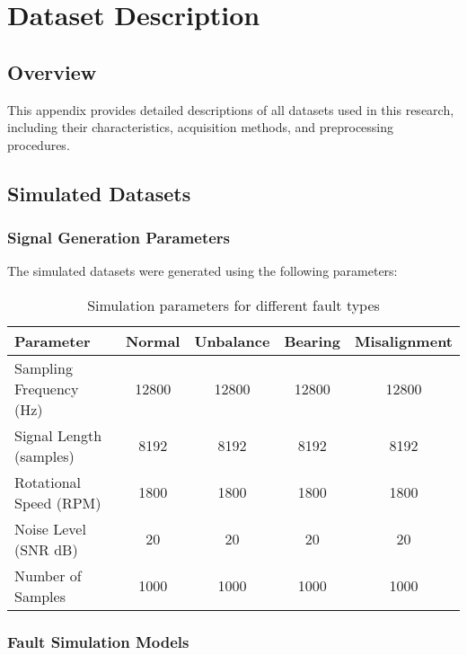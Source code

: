 
\chapter{Dataset Description}

\section{Overview}

This appendix provides detailed descriptions of all datasets used in this research, including their characteristics, acquisition methods, and preprocessing procedures.

\section{Simulated Datasets}

\subsection{Signal Generation Parameters}

The simulated datasets were generated using the following parameters:

\begin{table}[H]
\centering
\caption{Simulation parameters for different fault types}
\label{tab:simulation_params}
\begin{tabular}{@{}lcccc@{}}
\toprule
Parameter & Normal & Unbalance & Bearing & Misalignment \\
\midrule
Sampling Frequency (Hz) & 12800 & 12800 & 12800 & 12800 \\
Signal Length (samples) & 8192 & 8192 & 8192 & 8192 \\
Rotational Speed (RPM) & 1800 & 1800 & 1800 & 1800 \\
Noise Level (SNR dB) & 20 & 20 & 20 & 20 \\
Number of Samples & 1000 & 1000 & 1000 & 1000 \\
\bottomrule
\end{tabular}
\end{table}

\subsection{Fault Simulation Models}

